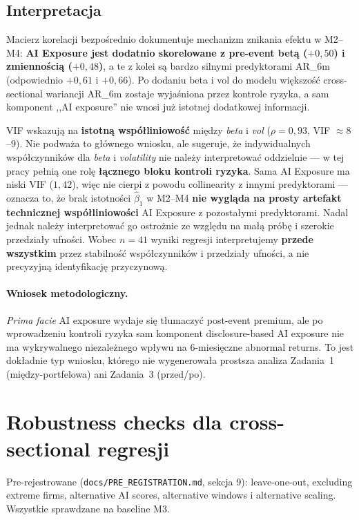 \documentclass[11pt,a4paper]{article}
\begin{document}
\subsection{Interpretacja}
Macierz korelacji bezpośrednio dokumentuje mechanizm znikania efektu w M2--M4:
\textbf{AI Exposure jest dodatnio skorelowane z pre-event betą ($+0{,}50$)
i zmiennością ($+0{,}48$)}, a te z kolei są bardzo silnymi predyktorami AR\_6m
(odpowiednio $+0{,}61$ i $+0{,}66$). Po dodaniu beta i vol do modelu większość
cross-sectional wariancji AR\_6m zostaje wyjaśniona przez kontrole ryzyka,
a sam komponent ,,AI exposure'' nie wnosi już istotnej dodatkowej informacji.

VIF wskazują na \textbf{istotną współliniowość} między \emph{beta} i \emph{vol}
($\rho = 0{,}93$, VIF $\approx 8$--$9$). Nie podważa to głównego wniosku, ale
sugeruje, że indywidualnych współczynników dla \emph{beta} i \emph{volatility}
nie należy interpretować oddzielnie --- w tej pracy pełnią one rolę
\textbf{łącznego bloku kontroli ryzyka}. Sama AI Exposure ma niski VIF
($1{,}42$), więc nie cierpi z powodu collinearity z innymi predyktorami ---
oznacza to, że brak istotności $\hat\beta_1$ w M2--M4 \textbf{nie wygląda
na prosty artefakt technicznej współliniowości} AI Exposure z pozostałymi
predyktorami. Nadal jednak należy interpretować go ostrożnie ze względu na
małą próbę i szerokie przedziały ufności. Wobec $n = 41$ wyniki regresji
interpretujemy \textbf{przede wszystkim} przez stabilność współczynników
i przedziały ufności, a nie precyzyjną identyfikację przyczynową.

\paragraph{Wniosek metodologiczny.}
\emph{Prima facie} AI exposure wydaje się tłumaczyć post-event premium, ale
po wprowadzeniu kontroli ryzyka sam komponent disclosure-based AI exposure
nie ma wykrywalnego niezależnego wpływu na 6-miesięczne abnormal returns.
To jest dokładnie typ wniosku, którego nie wygenerowała prostsza analiza
Zadania~1 (między-portfelowa) ani Zadania~3 (przed/po).

\clearpage
\section{Robustness checks dla cross-sectional regresji}
\label{sec:rob}

Pre-rejestrowane (\texttt{docs/PRE\_REGISTRATION.md}, sekcja 9):
leave-one-out, excluding extreme firms, alternative AI scores, alternative
windows i alternative scaling. Wszystkie sprawdzane na baseline M3.
\end{document}
